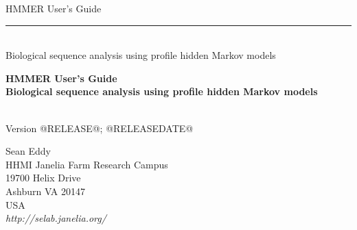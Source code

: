 \begin{titlepage}
{\Large

\vspace*{\fill}

\begin{latexonly}
\noindent
{\Huge \textsf{HMMER User's Guide}} \\ 
\rule[2pt]{\textwidth}{1pt} \\
\hspace*{\fill} {\large \textsf{Biological sequence analysis using
profile hidden Markov models} \\ }
\end{latexonly}

\begin{htmlonly}
\begin{center}
{\Huge \textbf{HMMER User's Guide}}\\
{\large \textbf{Biological sequence analysis using
profile hidden Markov models}}\\
\end{center}
\end{htmlonly}

\vspace*{\fill}

\begin{center}
\textsl{}\\
Version @RELEASE@; @RELEASEDATE@ \\ 

\vspace*{\fill}

Sean Eddy\\
HHMI Janelia Farm Research Campus\\
19700 Helix Drive\\
Ashburn VA 20147\\
USA\\
\textsl{http://selab.janelia.org/}
\end{center}

\vspace*{\fill}

}
\end{titlepage}

